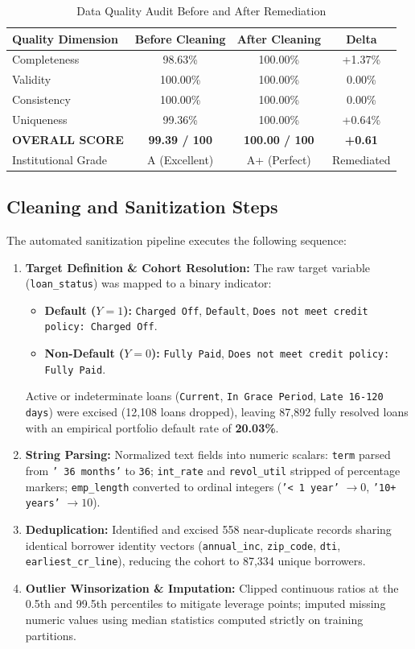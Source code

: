 \documentclass[conference]{IEEEtran}
\begin{document}
\begin{table}[htbp]
\caption{Data Quality Audit Before and After Remediation}
\label{tab:quality}
\centering
\begin{tabular}{lccc}
\toprule
\textbf{Quality Dimension} & \textbf{Before Cleaning} & \textbf{After Cleaning} & \textbf{Delta} \\
\midrule
Completeness & 98.63\% & 100.00\% & +1.37\% \\
Validity & 100.00\% & 100.00\% & 0.00\% \\
Consistency & 100.00\% & 100.00\% & 0.00\% \\
Uniqueness & 99.36\% & 100.00\% & +0.64\% \\
\midrule
\textbf{OVERALL SCORE} & \textbf{99.39 / 100} & \textbf{100.00 / 100} & \textbf{+0.61} \\
Institutional Grade & A (Excellent) & A+ (Perfect) & Remediated \\
\bottomrule
\end{tabular}
\end{table}

\subsection{Cleaning and Sanitization Steps}
The automated sanitization pipeline executes the following sequence:
\begin{enumerate}
    \item \textbf{Target Definition \& Cohort Resolution:} The raw target variable (\texttt{loan\_status}) was mapped to a binary indicator:
    \begin{itemize}
        \item \textbf{Default ($Y = 1$):} \texttt{Charged Off}, \texttt{Default}, \texttt{Does not meet credit policy: Charged Off}.
        \item \textbf{Non-Default ($Y = 0$):} \texttt{Fully Paid}, \texttt{Does not meet credit policy: Fully Paid}.
    \end{itemize}
    Active or indeterminate loans (\texttt{Current}, \texttt{In Grace Period}, \texttt{Late 16-120 days}) were excised (12,108 loans dropped), leaving 87,892 fully resolved loans with an empirical portfolio default rate of \textbf{20.03\%}.
    \item \textbf{String Parsing:} Normalized text fields into numeric scalars: \texttt{term} parsed from \texttt{' 36 months'} to \texttt{36}; \texttt{int\_rate} and \texttt{revol\_util} stripped of percentage markers; \texttt{emp\_length} converted to ordinal integers (\texttt{'< 1 year'} $\rightarrow 0$, \texttt{'10+ years'} $\rightarrow 10$).
    \item \textbf{Deduplication:} Identified and excised 558 near-duplicate records sharing identical borrower identity vectors (\texttt{annual\_inc}, \texttt{zip\_code}, \texttt{dti}, \texttt{earliest\_cr\_line}), reducing the cohort to 87,334 unique borrowers.
    \item \textbf{Outlier Winsorization \& Imputation:} Clipped continuous ratios at the 0.5th and 99.5th percentiles to mitigate leverage points; imputed missing numeric values using median statistics computed strictly on training partitions.
\end{enumerate}
\end{document}
